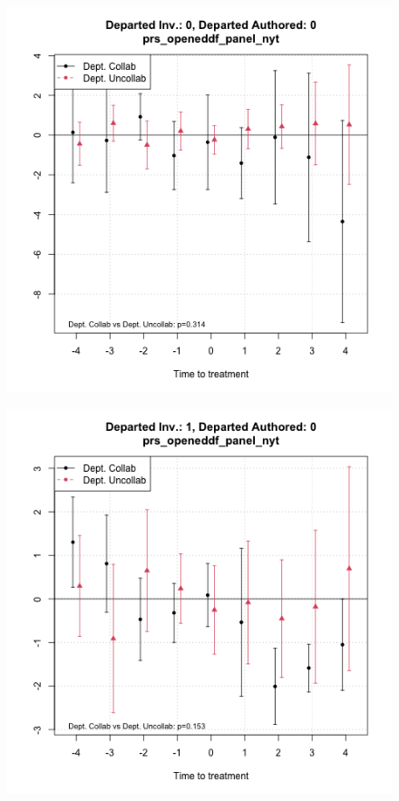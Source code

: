 \begin{figure}[htbp]
    
    \begin{minipage}[b]{0.32\textwidth}
        \centering
        \includegraphics[width=\textwidth]{temp/output/collab_imp/auth0_inv0_cs_norm_prs_opened.png}
    \label{fig:prs_opened_noninv_nonopen}
    \end{minipage}
    \hfill
    \begin{minipage}[b]{0.32\textwidth}
        \centering
        \includegraphics[width=\textwidth]{temp/output/collab_imp/auth0_inv1_cs_norm_prs_opened.png}

\end{minipage}
\end{figure}
